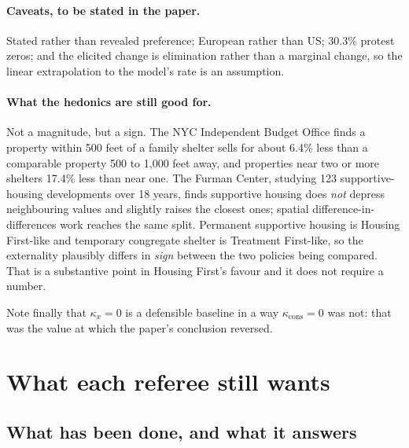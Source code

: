 \documentclass[11pt]{article}
\begin{document}
\paragraph{Caveats, to be stated in the paper.} Stated rather than revealed
preference; European rather than US; 30.3\% protest zeros; and the elicited
change is elimination rather than a marginal change, so the linear extrapolation
to the model's rate is an assumption.

\paragraph{What the hedonics are still good for.} Not a magnitude, but a sign.
The NYC Independent Budget Office finds a property within 500 feet of a family
shelter sells for about 6.4\% less than a comparable property 500 to 1,000 feet
away, and properties near two or more shelters 17.4\% less than near one. The
Furman Center, studying 123 supportive-housing developments over 18 years, finds
supportive housing does \emph{not} depress neighbouring values and slightly
raises the closest ones; spatial difference-in-differences work reaches the same
split. Permanent supportive housing is Housing First-like and temporary
congregate shelter is Treatment First-like, so the externality plausibly differs
in \emph{sign} between the two policies being compared. That is a substantive
point in Housing First's favour and it does not require a number.

Note finally that $\kappa_x=0$ is a defensible baseline in a way
$\kappa_{\text{cons}}=0$ was not: that was the value at which the paper's
conclusion reversed.

\section{What each referee still wants}
\label{sec:outstanding}

\subsection{What has been done, and what it answers}
\end{document}
